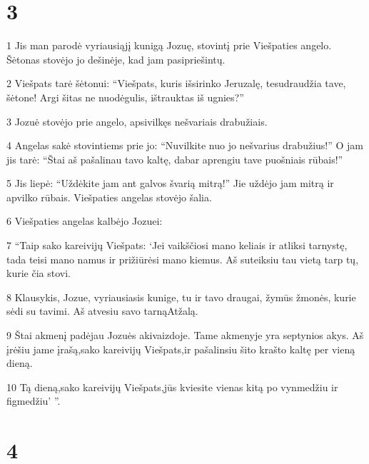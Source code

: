 \chapter{3}


\par 1 Jis man parodė vyriausiąjį kunigą Jozuę, stovintį prie Viešpaties angelo. Šėtonas stovėjo jo dešinėje, kad jam pasipriešintų. 
\par 2 Viešpats tarė šėtonui: “Viešpats, kuris išsirinko Jeruzalę, tesudraudžia tave, šėtone! Argi šitas ne nuodėgulis, ištrauktas iš ugnies?” 
\par 3 Jozuė stovėjo prie angelo, apsivilkęs nešvariais drabužiais. 
\par 4 Angelas sakė stovintiems prie jo: “Nuvilkite nuo jo nešvarius drabužius!” O jam jis tarė: “Štai aš pašalinau tavo kaltę, dabar aprengiu tave puošniais rūbais!” 
\par 5 Jis liepė: “Uždėkite jam ant galvos švarią mitrą!” Jie uždėjo jam mitrą ir apvilko rūbais. Viešpaties angelas stovėjo šalia. 
\par 6 Viešpaties angelas kalbėjo Jozuei: 
\par 7 “Taip sako kareivijų Viešpats: ‘Jei vaikščiosi mano keliais ir atliksi tarnystę, tada teisi mano namus ir prižiūrėsi mano kiemus. Aš suteiksiu tau vietą tarp tų, kurie čia stovi. 
\par 8 Klausykis, Jozue, vyriausiasis kunige, tu ir tavo draugai, žymūs žmonės, kurie sėdi su tavimi. Aš atvesiu savo tarną­Atžalą. 
\par 9 Štai akmenį padėjau Jozuės akivaizdoje. Tame akmenyje yra septynios akys. Aš įrėšiu jame įrašą,­sako kareivijų Viešpats,­ir pašalinsiu šito krašto kaltę per vieną dieną. 
\par 10 Tą dieną,­sako kareivijų Viešpats,­jūs kviesite vienas kitą po vynmedžiu ir figmedžiu’ ”.



\chapter{4}


